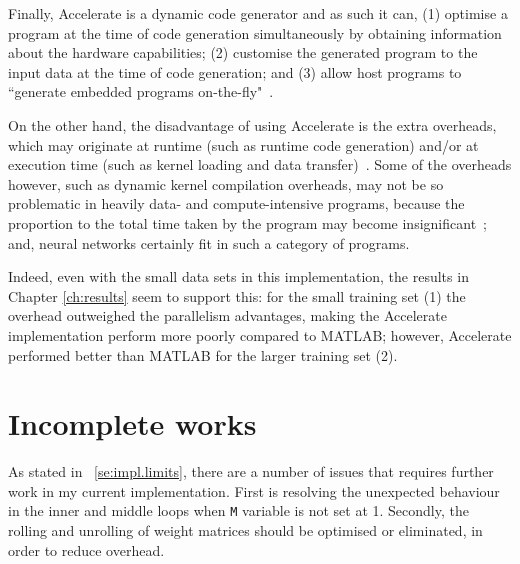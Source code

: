 Finally, Accelerate is a dynamic code generator and as such it can, (1) optimise a program at the time of code generation simultaneously by obtaining information about the hardware capabilities; (2) customise the generated program to the input data at the time of code generation; and (3) allow host programs to ``generate embedded programs on-the-fly"~\cite{ChaKelLee11}.

On the other hand, the disadvantage of using Accelerate is the extra overheads, which may originate at runtime (such as runtime code generation) and/or at execution time (such as kernel loading and data transfer)~\cite{ChaKelLee11}. Some of the overheads however, such as dynamic kernel compilation overheads, may not be so problematic in heavily data- and compute-intensive programs, because the proportion to the total time taken by the program may become insignificant~\cite{ChaKelLee11}; and, neural networks certainly fit in such a category of programs. 

Indeed, even with the small data sets in this implementation, the results in Chapter \ref{ch:results} seem to support this: for the small training set (1) the overhead outweighed the parallelism advantages, making the Accelerate implementation perform more poorly compared to MATLAB; however, Accelerate performed better than MATLAB for the larger training set (2).

\section{Incomplete works} \label{se:eval.incomplete}

As stated in ~\ref{se:impl.limits}, there are a number of issues that requires further work in my current implementation. First is resolving the unexpected behaviour in the inner and middle loops when \texttt{M} variable is not set at 1. Secondly, the rolling and unrolling of weight matrices should be optimised or eliminated, in order to reduce overhead. 

